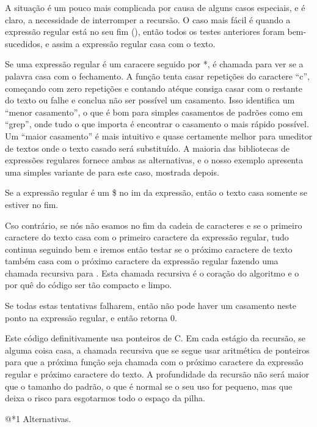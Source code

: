 A situação é um pouco mais complicada por causa de alguns casos
especiais, e é claro, a necessidade de interromper a recursão. O caso
mais fácil é quando a expressão regular está no seu fim
(), então todos os testes anteriores
foram bem-sucedidos, e assim a expressão regular casa com o texto.

Se uma expressão regular é um caracere seguido por *,
 é chamada para ver se a palavra casa com o
fechamento. A função  tenta
casar repetições do caractere ``c'', começando com zero repetições e
contando atéque consiga casar com o restante do texto ou falhe e
conclua não ser possível um casamento. Isso identifica um ``menor
casamento'', o que é bom para simples casamentos de padrões como em
``grep'', onde tudo o que importa é encontrar o casamento o mais
rápido possível. Um ``maior casamento'' é mais intuitivo e quase
certamente melhor para umeditor de textos onde o texto casado será
substituído. A maioria das bibliotecas de expressões regulares fornece
ambas as alternativas, e o nosso exemplo apresenta uma simples
variante de  para este caso, mostrada depois.

Se a expressão regular é um \$ no im da expressão, então o texto casa
somente se estiver no fim.

Cso contrário, se nós não esamos no fim da cadeia de caracteres e se o
primeiro caractere do texto casa com o primeiro caractere da expressão
regular, tudo continua seguindo bem e iremos então testar se o próximo
caractere de texto também casa com o próximo caractere da expressão
regular fazendo uma chamada recursiva para
. Esta chamada recursiva é o coração do
algoritmo e o por quê do código ser tão compacto e limpo.

Se todas estas tentativas falharem, então não pode haver um casamento
neste ponto na expressão regular, e então 
retorna 0.

Este código definitivamente usa ponteiros de C. Em cada estágio da
recursão, se alguma coisa casa, a chamada recursiva que se segue usar
aritmética de ponteiros para que a próxima função seja chamada com o
próximo caractere da expressão regular e próximo caractere do texto. A
profundidade da recursão não será maior que o tamanho do padrão, o que
é normal se o seu uso for pequeno, mas que deixa o risco para
esgotarmos todo o espaço da pilha.

@*1 Alternativas.

